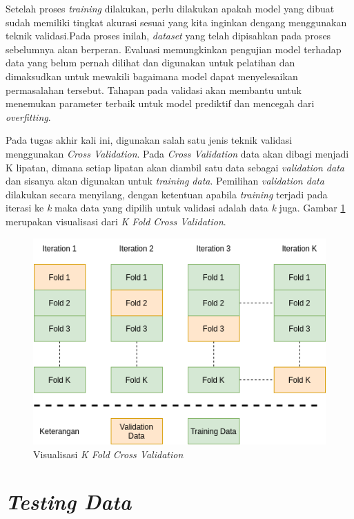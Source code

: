 Setelah proses \textit{training} dilakukan, perlu dilakukan apakah model yang dibuat sudah memiliki tingkat akurasi sesuai yang kita inginkan dengang menggunakan teknik validasi.Pada proses inilah, \textit{dataset} yang telah dipisahkan pada proses sebelumnya akan berperan. Evaluasi memungkinkan pengujian model terhadap data yang belum pernah dilihat dan digunakan untuk pelatihan dan dimaksudkan untuk mewakili bagaimana model dapat menyelesaikan permasalahan tersebut. Tahapan pada validasi akan membantu untuk menemukan parameter terbaik untuk model prediktif dan mencegah dari \textit{overfitting}.

Pada tugas akhir kali ini, digunakan salah satu jenis teknik validasi menggunakan \textit{Cross Validation}. Pada \textit{Cross Validation} data akan dibagi menjadi K lipatan, dimana setiap lipatan akan diambil satu data sebagai \textit{validation data} dan sisanya akan digunakan untuk \textit{training data}. Pemilihan \textit{validation data} dilakukan secara menyilang, dengan ketentuan apabila \textit{training} terjadi pada iterasi ke \textit{k} maka data yang dipilih untuk validasi adalah data \textit{k} juga. Gambar \ref{fig:cross-validation} merupakan visualisasi dari \textit{K Fold Cross Validation}.

\begin{figure}[ht]
	\centering
	\includegraphics[scale=0.4]{gambar/cross-validation.png}
	\caption{Visualisasi \textit{K Fold Cross Validation}}
	\label{fig:cross-validation}
\end{figure} 

\section{\textit{Testing Data}
	\label{sec:testingdata}}

